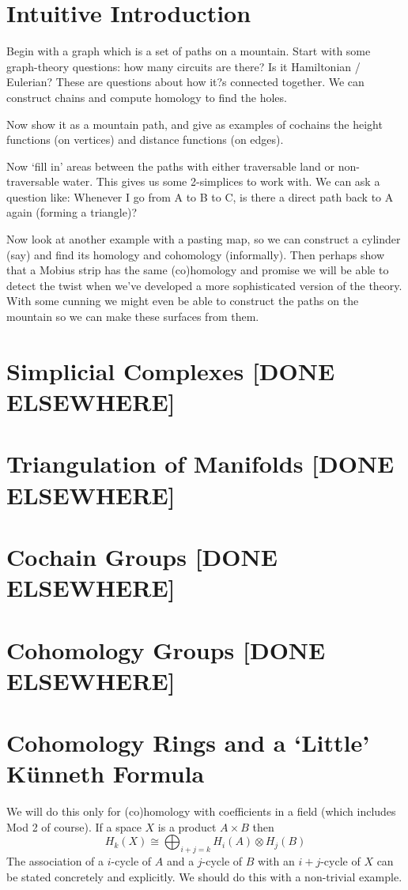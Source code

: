 \documentclass[oneside,english]{amsbook}
\numberwithin{section}{chapter}
\theoremstyle{plain}
\theoremstyle{definition}
\providecommand{\Kunneth}{K{\"u}nneth }
\begin{document}
	\section{Intuitive Introduction}
		Begin with a graph which is a set of paths on a mountain. Start with some graph-theory questions: how many circuits are there? Is it Hamiltonian / Eulerian? These are questions about how it?s connected together. We can construct chains and compute homology to find the holes.
		
		Now show it as a mountain path, and give as examples of cochains the height functions (on vertices) and distance functions (on edges).
		
		Now `fill in' areas between the paths with either traversable land or non-traversable water. This gives us some 2-simplices to work with. We can ask a question like: Whenever I go from A to B to C, is there a direct path back to A again (forming a triangle)?
		
		Now look at another example with a pasting map, so we can construct a cylinder (say) and find its homology and cohomology (informally). Then perhaps show that a M\:obius strip has the same (co)homology and promise we will be able to detect the twist when we've developed a more sophisticated version of the theory. With some cunning we might even be able to construct the paths on the mountain so we can make these surfaces from them.

	\section{Simplicial Complexes [DONE ELSEWHERE]}
	\section{Triangulation of Manifolds [DONE ELSEWHERE]}
	\section{Cochain Groups [DONE ELSEWHERE]}
	\section{Cohomology Groups [DONE ELSEWHERE]}
	\section{Cohomology Rings and a `Little' \Kunneth Formula}
	
	We will do this only for (co)homology with coefficients in a field (which includes Mod 2 of course). If a space $X$ is a product $A\times B$ then
	\[
		H_k (X) \cong \bigoplus_{i+j=k} H_i(A)\otimes H_j (B) 
 	\]
 	The association of a $i$-cycle of $A$ and a $j$-cycle of $B$ with an $i+j$-cycle of $X$ can be stated concretely and explicitly. We should do this with a non-trivial example.
 	
\end{document}
